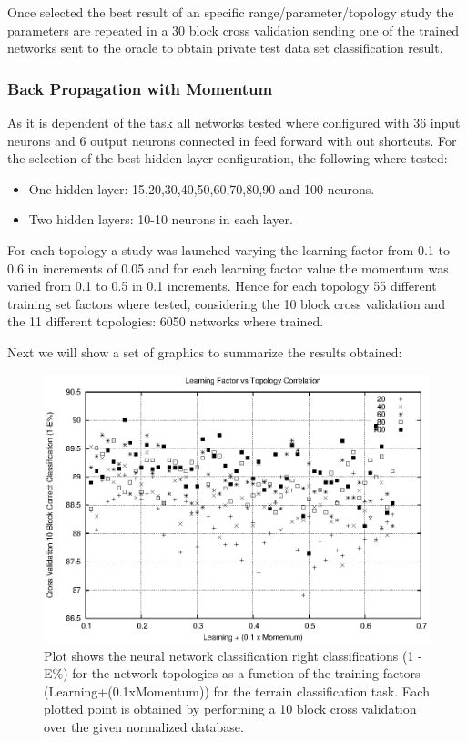 \documentclass[a4paper,10pt,titlepage]{article}
\begin{document}
\par Once selected the best result of an specific range/parameter/topology study the parameters are repeated in a 30 block cross validation sending one of the trained networks sent to the oracle to obtain private test data set classification result.

\subsubsection{Back Propagation with Momentum}

\par As it is dependent of the task all networks tested where configured with 36 input neurons and 6 output neurons connected in feed forward with out shortcuts. For the selection of the best hidden layer configuration, the following where tested:
\begin{itemize}
	\item One hidden layer: 15,20,30,40,50,60,70,80,90 and 100 neurons.
	\item Two hidden layers: 10-10 neurons in each layer. 
\end{itemize}

\par For each topology a study was launched varying the learning factor from 0.1 to 0.6 in increments of 0.05 and for each learning factor value the momentum was varied from 0.1 to 0.5 in 0.1 increments. Hence for each topology 55 different training set factors where tested, considering the 10 block cross validation and the 11 different topologies: 6050 networks where trained. 

\par Next we will show a set of graphics to summarize the results obtained: 


\begin{figure}[H]
	\centerline{%
	\includegraphics[]{learning_topology.eps}
	}
	\caption[Terrain classification task: Correlation of the learning factor over the topology]{Plot shows the neural network classification right classifications (1 - E\%) for the network topologies as a function of the training factors (Learning+(0.1xMomentum)) for the  terrain classification task. Each plotted point is obtained by performing a 10 block cross validation over the given normalized database.}
\end{figure}
\end{document}
